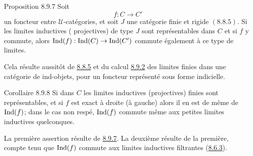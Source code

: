 \documentclass[10pt]{../fichiers-configuration-latex/smfart}
\begin{document}
\begin{enonce*}{Proposition 8.9.7}
Soit\pageoriginale
$$
f:C\longrightarrow C'
$$
un foncteur entre $𝒰$-catégories, et soit $J$ une catégorie
finie et rigide $(8.8.5)$. Si les limites inductives (\resp
projectives) de type $J$ sont représentables dans $C$ et si $f$ y
commute, alors $\operatorname{Ind}(f):\operatorname{Ind}(C)\rightarrow \operatorname{Ind}(C')$ commute
également à ce type de limites.
\end{enonce*}

Cela résulte aussitôt de \hyperref[I.prop8.8.5]{8.8.5} et du calcul
\hyperref[I.cor8.9.2]{8.9.2} des limites finies dans une catégorie de
ind-objets, pour un foncteur représenté sous forme indicielle.

\begin{enonce*}{Corollaire 8.9.8}
Si dans $C$ les limites inductives (\resp projectives) finies sont
représentables, et si $f$ est exact à droite (\resp à gauche) alors
il en est de même de $\operatorname{Ind}(f)$; dans le cas non respé, $\operatorname{Ind}(f)$
commute même aux petites limites inductives quelconques.
\end{enonce*}

La première assertion résulte de \hyperref[I.prop8.9.7]{8.9.7}. La deuxième
résulte de la première, compte tenu que $\operatorname{Ind}(f)$ commute aux
limites inductives filtrantes (\hyperref[I.prop8.6.3]{8.6.3}).
\end{document}
